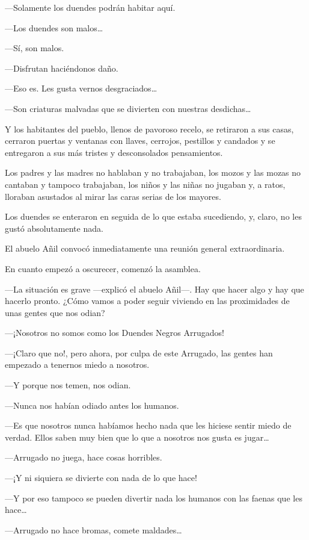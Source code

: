 \documentclass{barcodevapor3pags}
\begin{document}
---Solamente los duendes podrán habitar aquí.

---Los duendes son malos\ldots{}

---Sí, son malos.

---Disfrutan haciéndonos daño.

---Eso es. Les gusta vernos desgraciados\ldots{}

---Son criaturas malvadas que se divierten con nuestras
desdichas\ldots{}

Y los habitantes del pueblo, llenos de pavoroso recelo, se retiraron a
sus casas, cerraron puertas y ventanas con llaves, cerrojos, pestillos y
candados y se entregaron a sus más tristes y desconsolados pensamientos.

Los padres y las madres no hablaban y no trabajaban, los mozos y las
mozas no cantaban y tampoco trabajaban, los niños y las niñas no jugaban
y, a ratos, lloraban asustados al mirar las caras serias de los mayores.

Los duendes se enteraron en seguida de lo que estaba sucediendo, y,
claro, no les gustó absolutamente nada.

El abuelo Añil convocó inmediatamente una reunión general
extraordinaria.

En cuanto empezó a oscurecer, comenzó la asamblea.

---La situación es grave ---explicó el abuelo Añil---. Hay que hacer
algo y hay que hacerlo pronto. ¿Cómo vamos a poder seguir viviendo en
las proximidades de unas gentes que nos odian?

---¡Nosotros no somos como los Duendes Negros Arrugados!

---¡Claro que no!, pero ahora, por culpa de este Arrugado, las gentes
han empezado a tenernos miedo a nosotros.

---Y porque nos temen, nos odian.

---Nunca nos habían odiado antes los humanos.

---Es que nosotros nunca habíamos hecho nada que les hiciese sentir
miedo de verdad. Ellos saben muy bien que lo que a nosotros nos gusta es
jugar\ldots{}

---Arrugado no juega, hace cosas horribles.

---¡Y ni siquiera se divierte con nada de lo que hace!

---Y por eso tampoco se pueden divertir nada los humanos con las faenas
que les hace\ldots{}

---Arrugado no hace bromas, comete maldades\ldots{}
\end{document}
